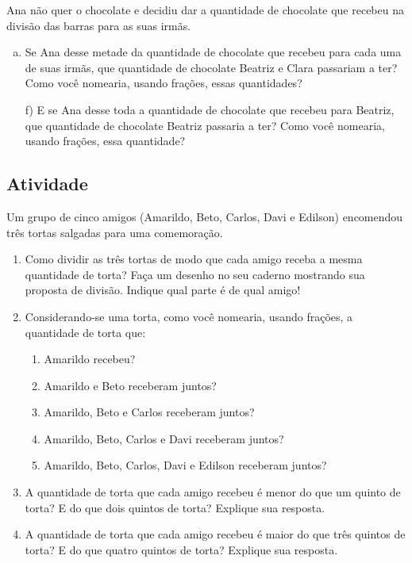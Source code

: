 \documentclass[a4,12pt]{book}
\begin{document}
Ana não quer o chocolate e decidiu dar a quantidade de chocolate que recebeu na divisão das barras para as suas irmãs.

\begin{enumerate}[e)]
\item Se Ana desse metade da quantidade de chocolate que recebeu para cada uma de suas irmãs, que quantidade de chocolate Beatriz e Clara passariam a ter? Como você nomearia, usando frações, essas quantidades?  
\item[f)] E se Ana desse toda a quantidade de chocolate que recebeu para Beatriz, que quantidade de chocolate  Beatriz passaria a ter? Como você nomearia, usando frações, essa quantidade?
\end{enumerate} %


\subsection{Atividade}

Um grupo de cinco amigos (Amarildo, Beto, Carlos, Davi e Edilson) encomendou três tortas salgadas para uma comemoração.

\begin{center}
  
\end{center}
 
\begin{enumerate} [\quad a)] %
  \item     Como dividir as três tortas de modo que cada amigo receba a mesma quantidade de torta? Faça um desenho no seu caderno mostrando sua proposta de divisão. Indique qual parte é de qual amigo!
  \item     Considerando-se uma torta, como você nomearia, usando frações, a quantidade de torta que:     
\begin{enumerate} [\quad I)] %
      \item         Amarildo recebeu? 
      \item         Amarildo e Beto receberam juntos? 
      \item         Amarildo, Beto e Carlos receberam juntos? 
      \item         Amarildo, Beto, Carlos e Davi receberam juntos?
      \item         Amarildo, Beto, Carlos, Davi e Edilson receberam juntos?
\end{enumerate} %

  \item     A quantidade de torta que cada amigo recebeu é menor do que um quinto de torta? E do que dois quintos de torta? Explique sua resposta.
  \item     A quantidade de torta que cada amigo recebeu é maior do que três quintos de torta? E do que quatro quintos de torta? Explique sua resposta.
\end{enumerate} %
\end{document}
